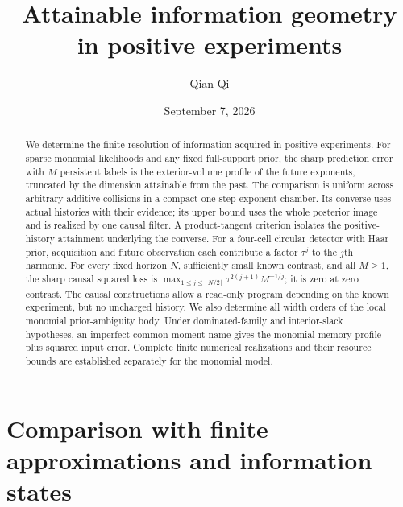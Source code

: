\documentclass[11pt]{amsart}
\title[Attainable information geometry]{Attainable information geometry\\ in positive experiments}
\author{Qian Qi}
\date{September 7, 2026}
\theoremstyle{definition}\newtheorem{definition}[theorem]{Definition}
\theoremstyle{remark}\newtheorem{remark}[theorem]{Remark}
\begin{document}
\begin{abstract}
We determine the finite resolution of information acquired in positive
experiments. For sparse monomial likelihoods and any fixed full-support
prior, the sharp prediction error with $M$ persistent labels is the
exterior-volume profile of the future exponents, truncated by the
dimension attainable from the past. The comparison is uniform across
arbitrary additive collisions in a compact one-step exponent chamber.
Its converse uses actual histories with their evidence; its upper bound
uses the whole posterior image and is realized by one causal filter.
A product-tangent criterion isolates the positive-history attainment
underlying the converse. For a four-cell circular detector with Haar
prior, acquisition and future observation each contribute a factor
$\tau^j$ to the $j$th harmonic. For every fixed horizon $N$, sufficiently
small known contrast, and all $M\ge1$, the sharp causal squared loss is
$\max_{1\le j\le\lfloor N/2\rfloor}\tau^{2(j+1)}M^{-1/j}$;
it is zero at zero contrast. The causal constructions allow a read-only
program depending on the known experiment, but no uncharged history.
We also determine all width orders of the local monomial prior-ambiguity
body. Under dominated-family and interior-slack hypotheses, an imperfect
common moment name gives the monomial memory profile plus squared input
error. Complete finite numerical realizations and their resource bounds
are established separately for the monomial model.
\end{abstract}
\maketitle












\appendix












\section{Comparison with finite approximations and information states}
\label{sec:literature-comparison}


\end{document}
